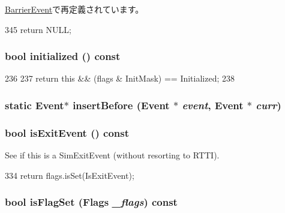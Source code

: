 \hyperlink{classBaseGlobalEvent_1_1BarrierEvent_a22afab66586c2982ac7548fba9e6835b}{BarrierEvent}で再定義されています。


\begin{DoxyCode}
345 { return NULL; }
\end{DoxyCode}
\hypertarget{classEvent_aa2a7557ebf105cff8a91f2af1511adf0}{
\subsubsection[{initialized}]{\setlength{\rightskip}{0pt plus 5cm}bool initialized () const}}
\label{classEvent_aa2a7557ebf105cff8a91f2af1511adf0}



\begin{DoxyCode}
236     {
237         return this && (flags & InitMask) == Initialized;
238     }
\end{DoxyCode}
\hypertarget{classEvent_a67dc02b0253a9a268380268612a74b2c}{
\subsubsection[{insertBefore}]{\setlength{\rightskip}{0pt plus 5cm}static {\bf Event}$\ast$ insertBefore ({\bf Event} $\ast$ {\em event}, \/  {\bf Event} $\ast$ {\em curr})}}
\label{classEvent_a67dc02b0253a9a268380268612a74b2c}
\hypertarget{classEvent_a6035963416c1279143194a9bcd88b314}{
\subsubsection[{isExitEvent}]{\setlength{\rightskip}{0pt plus 5cm}bool isExitEvent () const}}
\label{classEvent_a6035963416c1279143194a9bcd88b314}


See if this is a SimExitEvent (without resorting to RTTI). 


\begin{DoxyCode}
334 { return flags.isSet(IsExitEvent); }
\end{DoxyCode}
\hypertarget{classEvent_ac51cd4574b80bff5304e33fbc28db177}{
\subsubsection[{isFlagSet}]{\setlength{\rightskip}{0pt plus 5cm}bool isFlagSet ({\bf Flags} {\em \_\-flags}) const}}
\label{classEvent_ac51cd4574b80bff5304e33fbc28db177}



